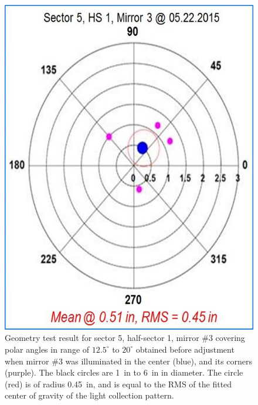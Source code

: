 \begin{figure}[ht]
    \centering
    \includegraphics[width=1.0\linewidth,trim={0 0cm 0 0},clip]{images/Ch_5_1_3_Before_NEW.jpg}
    \caption{Geometry test result for sector 5, half-sector 1, mirror \#3 covering polar angles in range of
      $12.5^\circ$ to $20^\circ$ obtained before adjustment when mirror \#3 was illuminated in the center (blue),
      and its corners (purple). The black circles are 1~in to 6~in in diameter. The circle (red) is of radius 0.45~in,
      and is equal to the RMS of the fitted center of gravity of the light collection pattern.}
    \label{fig:Ch_5_1_3_Before_NEW}
\end{figure}

